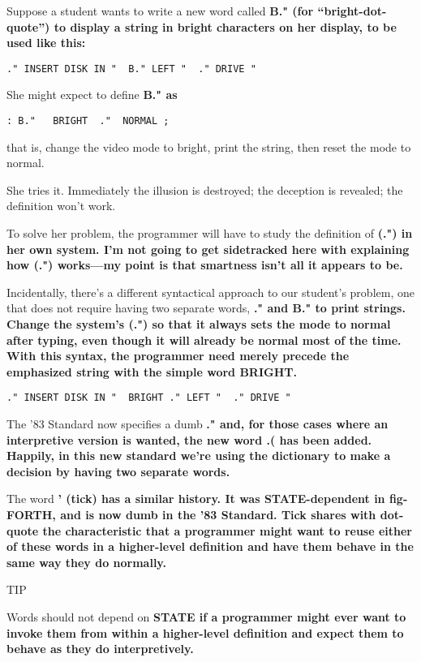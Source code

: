 Suppose a student wants to write a new word called \bf{B."} (for
``bright-dot-quote'') to display a string in bright characters on her
display, to be used like this:

\begin{verbatim}
." INSERT DISK IN "  B." LEFT "  ." DRIVE "
\end{verbatim}

She might expect to define \bf{B."} as

\begin{verbatim}
: B."   BRIGHT  ."  NORMAL ;
\end{verbatim}

that is, change the video mode to bright, print the string, then reset the
mode to normal.

She tries it. Immediately the illusion is destroyed; the deception is
revealed; the definition won't work.

To solve her problem, the programmer will have to study the definition
of \bf{(.")} in her own system. I'm not going to get sidetracked here with
explaining how \bf{(.")} works---my point is that smartness isn't all it
appears to be.

Incidentally, there's a different syntactical approach to our
student's problem, one that does not require having two separate words,
\bf{."} and \bf{B."} to print strings. Change the system's \bf{(.")} so
that it always sets the mode to normal after typing, even though it will
already be normal most of the time. With this syntax, the programmer
need merely precede the emphasized string with the simple word BRIGHT.

\begin{verbatim}
." INSERT DISK IN "  BRIGHT ." LEFT "  ." DRIVE "
\end{verbatim}

The '83 Standard now specifies a dumb \bf{."} and, for those cases where an
interpretive version is wanted, the new word \bf{.(} has been added. Happily,
in this new standard we're using the dictionary to make a decision by
having two separate words.

The word \bf{'} (tick) has a similar history. It was \bf{STATE}-dependent in
fig-FORTH, and is now dumb in the '83 Standard. Tick shares with
dot-quote the characteristic that a programmer might want to reuse either of
these words in a higher-level definition and have them behave in the same
way they do normally.

TIP

Words should not depend on \bf{STATE} if a programmer might ever want to
invoke them from within a higher-level definition and expect them to
behave as they do interpretively.

